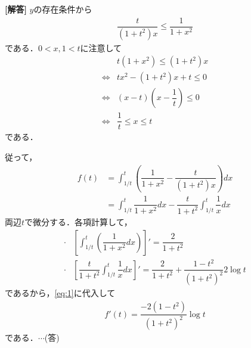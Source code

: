 \documentclass[../../main.tex]{subfiles}
\begin{document}
\begin{oframed}
  
\end{oframed}

{\bf [解答]} $y$の存在条件から
\begin{align}
  \dfrac{t}{(1+t^2)x}\le\dfrac{1}{1+x^2}　
\end{align}
である．$0<x,1<t$に注意して
\begin{align}
  & t(1+x^2) \le (1+t^2)x \\
  \Longleftrightarrow
  & tx^2-(1+t^2)x+t \le 0 \\
  \Longleftrightarrow
  &(x-t)\left(x-\dfrac{1}{t}\right)\le 0 \\
  \Longleftrightarrow
  &\dfrac{1}{t}\le x\le t
\end{align}
である．

従って，
\begin{align}
  f(t)&=\int_{1/t}^t\left(\dfrac{1}{1+x^2}-\dfrac{t}{(1+t^2)x}\right)dx \nonumber\\
  &=\int_{1/t}^t\dfrac{1}{1+x^2}dx-\dfrac{t}{1+t^2}\int_{1/t}^t\dfrac{1}{x}dx\label{eq:1}
\end{align}
両辺$t$で微分する．各項計算して，
\begin{align}
  \cdot&\left[\int_{1/t}^t\left(\dfrac{1}{1+x^2}dx\right)\right]'=\dfrac{2}{1+t^2} \\
  \cdot&\left[\dfrac{t}{1+t^2}\int_{1/t}^t\dfrac{1}{x}dx\right]'=\dfrac{2}{1+t^2}+\dfrac{1-t^2}{(1+t^2)^2}2\log t
\end{align}
であるから，\cref{eq:1}に代入して
\begin{align}
  f'(t)=\dfrac{-2(1-t^2)}{(1+t^2)^2}\log t
\end{align}
である．$\cdots$(答)
\newpage
\end{document}
